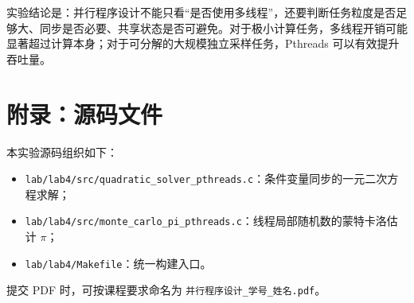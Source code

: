 \documentclass[UTF8,a4paper,12pt,fontset=none]{ctexart}
\begin{document}
实验结论是：并行程序设计不能只看“是否使用多线程”，还要判断任务粒度是否足够大、同步是否必要、共享状态是否可避免。对于极小计算任务，多线程开销可能显著超过计算本身；对于可分解的大规模独立采样任务，Pthreads 可以有效提升吞吐量。

\section*{附录：源码文件}

本实验源码组织如下：
\begin{itemize}
  \item \texttt{lab/lab4/src/quadratic\_solver\_pthreads.c}：条件变量同步的一元二次方程求解；
  \item \texttt{lab/lab4/src/monte\_carlo\_pi\_pthreads.c}：线程局部随机数的蒙特卡洛估计 \(\pi\)；
  \item \texttt{lab/lab4/Makefile}：统一构建入口。
\end{itemize}

提交 PDF 时，可按课程要求命名为 \texttt{并行程序设计\_学号\_姓名.pdf}。
\end{document}
